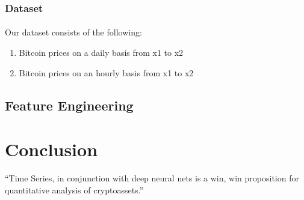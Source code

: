 \documentclass{article}
\begin{document}
\subsubsection{Dataset}
\paragraph{}
Our dataset consists of the following:
\begin{enumerate}
    \item Bitcoin prices on a daily basis from x1 to x2
    \item Bitcoin prices on an hourly basis from x1 to x2
\end{enumerate}


\subsection{Feature Engineering}





\section{Conclusion}
``Time Series, in conjunction with deep neural nets is a win, win proposition for quantitative analysis of cryptoassets.'' \citep{adams1995hitchhiker}



\end{document}
